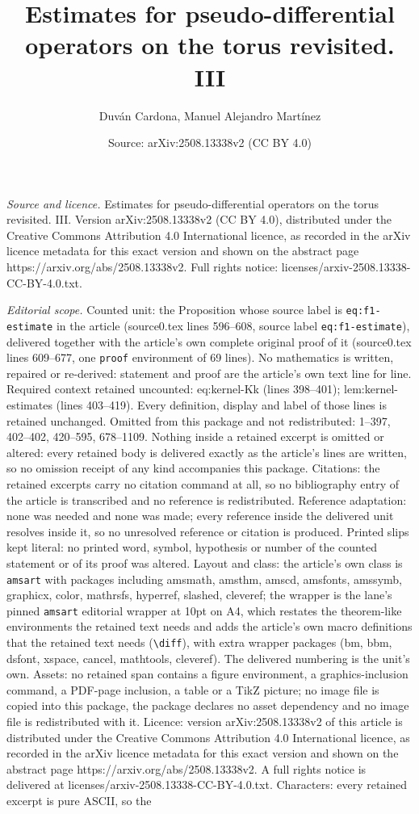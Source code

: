 \documentclass[10pt,a4paper]{amsart}
\title[Estimates for pseudo-differential operators on the torus rev]{Estimates for pseudo-differential operators on the torus revisited. III}
\author{Duv\'an Cardona, Manuel Alejandro Mart\'inez}
\date{Source: arXiv:2508.13338v2 (CC BY 4.0)}
\begin{document}
\maketitle

\noindent\emph{Source and licence.} Estimates for pseudo-differential operators on the torus revisited. III. Version arXiv:2508.13338v2 (CC BY 4.0), distributed under the Creative Commons Attribution 4.0 International licence, as recorded in the arXiv licence metadata for this exact version and shown on the abstract page https://arxiv.org/abs/2508.13338v2. Full rights notice: licenses/arxiv-2508.13338-CC-BY-4.0.txt.\par\smallskip

\noindent\textit{Editorial scope.} Counted unit: the Proposition whose source label is \texttt{eq:f1-estimate} in the article (source0.tex lines 596--608, source label \texttt{eq:f1-estimate}), delivered together with the article's own complete original proof of it (source0.tex lines 609--677, one \texttt{proof} environment of 69 lines). No mathematics is written, repaired or re-derived: statement and proof are the article's own text line for line. Required context retained uncounted: eq:kernel-Kk (lines 398--401); lem:kernel-estimates (lines 403--419). Every definition, display and label of those lines is retained unchanged. Omitted from this package and not redistributed: 1--397, 402--402, 420--595, 678--1109. Nothing inside a retained excerpt is omitted or altered: every retained body is delivered exactly as the article's lines are written, so no omission receipt of any kind accompanies this package. Citations: the retained excerpts carry no citation command at all, so no bibliography entry of the article is transcribed and no reference is redistributed. Reference adaptation: none was needed and none was made; every reference inside the delivered unit resolves inside it, so no unresolved reference or citation is produced. Printed slips kept literal: no printed word, symbol, hypothesis or number of the counted statement or of its proof was altered. Layout and class: the article's own class is \texttt{amsart} with packages including amsmath, amsthm, amscd, amsfonts, amssymb, graphicx, color, mathrsfs, hyperref, slashed, cleveref; the wrapper is the lane's pinned \texttt{amsart} editorial wrapper at 10pt on A4, which restates the theorem-like environments the retained text needs and adds the article's own macro definitions that the retained text needs (\texttt{\textbackslash diff}), with extra wrapper packages (bm, bbm, dsfont, xspace, cancel, mathtools, cleveref). The delivered numbering is the unit's own. Assets: no retained span contains a figure environment, a graphics-inclusion command, a PDF-page inclusion, a table or a TikZ picture; no image file is copied into this package, the package declares no asset dependency and no image file is redistributed with it. Licence: version arXiv:2508.13338v2 of this article is distributed under the Creative Commons Attribution 4.0 International licence, as recorded in the arXiv licence metadata for this exact version and shown on the abstract page https://arxiv.org/abs/2508.13338v2. A full rights notice is delivered at licenses/arxiv-2508.13338-CC-BY-4.0.txt. Characters: every retained excerpt is pure ASCII, so the 
\end{document}
